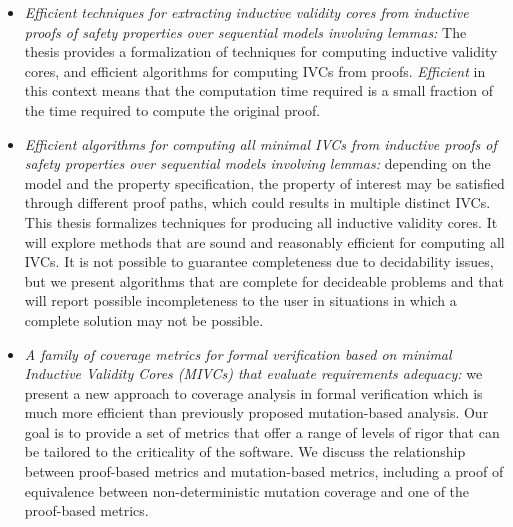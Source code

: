 \begin{itemize}
    \item \emph{Efficient techniques for extracting inductive validity cores from inductive proofs of safety properties over sequential models involving lemmas:} The thesis provides a formalization of techniques for computing inductive validity cores, and efficient algorithms for computing IVCs from proofs.  {\em Efficient} in this context means that the computation time required is a small fraction of the time required to compute the original proof.
    \item \emph{Efficient algorithms for computing all minimal IVCs from inductive proofs of safety properties over sequential models involving lemmas:} depending on the model and the property specification, the property of interest may be satisfied through different proof paths, which could results in multiple distinct IVCs. This thesis formalizes techniques for producing all inductive validity cores.  It will explore methods that are sound and reasonably efficient for computing all IVCs.  It is not possible to guarantee completeness due to decidability issues, but we present algorithms that are complete for decideable problems and that will report possible incompleteness to the user in situations in which a complete solution may not be possible.
   \item \emph{A family of coverage metrics for formal verification based on \emph{minimal} Inductive Validity Cores (MIVCs) that evaluate requirements adequacy:} we present a new approach to coverage analysis in formal verification which is much more efficient than previously proposed mutation-based analysis. Our goal is to provide a set of metrics that offer a range of levels of rigor that can be tailored to the criticality of the software. We discuss the relationship between proof-based metrics and mutation-based metrics, including a proof of equivalence between non-deterministic mutation coverage and one of the proof-based metrics.

\end{itemize}
